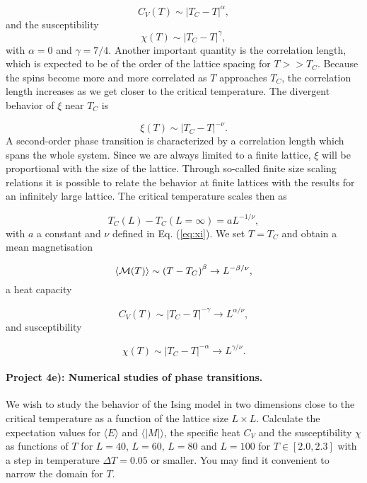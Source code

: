 \documentclass[10pt,showpacs,preprintnumbers,footinbib,amsmath,amssymb,aps,prl,twocolumn,groupedaddress,superscriptaddress,showkeys]{revtex4-1}
\begin{document}
\[
  C_V(T) \sim \left|T_C-T\right|^{\alpha},
\]
and the susceptibility
\begin{equation}
  \chi(T) \sim \left|T_C-T\right|^{\gamma},
\end{equation}
with $\alpha = 0$ and $\gamma = 7/4$.
Another important quantity is the correlation length, which is expected
to be of the order of the lattice spacing for $T>> T_C$. Because the spins
become more and more correlated as $T$ approaches $T_C$, the correlation
length increases as we get closer to the critical temperature. The divergent
behavior of $\xi$ near $T_C$ 
is

\begin{equation}
  \xi(T) \sim \left|T_C-T\right|^{-\nu}.
  \label{eq:xi}
\end{equation}
A second-order phase transition is characterized by a
correlation length which spans the whole system.
Since we are always limited to a finite lattice, $\xi$ will
be proportional with the size of the lattice. 
Through so-called finite size scaling relations
it is possible to relate the behavior at finite lattices with the 
results for an infinitely large lattice.
The critical temperature scales then as

\begin{equation}
 T_C(L)-T_C(L=\infty) = aL^{-1/\nu},
 \label{eq:tc}
\end{equation}
with  $a$ a constant and  $\nu$ defined in Eq. (\ref{eq:xi}).
We set $T=T_C$ and obtain a mean magnetisation

\begin{equation}
  \langle {\cal M}(T) \rangle \sim \left(T-T_C\right)^{\beta}
  \rightarrow L^{-\beta/\nu},
  \label{eq:scale1}
\end{equation}
a heat capacity

\begin{equation}
  C_V(T) \sim \left|T_C-T\right|^{-\gamma} \rightarrow L^{\alpha/\nu},
  \label{eq:scale2}
\end{equation}
and susceptibility

\begin{equation}
  \chi(T) \sim \left|T_C-T\right|^{-\alpha} \rightarrow L^{\gamma/\nu}.
  \label{eq:scale3}
\end{equation}


\paragraph{Project 4e): Numerical studies of phase transitions.}
We wish to study the behavior of the Ising model
in two dimensions close to the critical temperature as a function of
the lattice size $L\times L$. Calculate the expectation values for
$\langle E\rangle$ and $\langle \vert M\vert \rangle$, the specific heat
$C_V$ and the susceptibility $\chi$ as functions of $T$ for $L=40$,
$L=60$, $L=80$ and $L=100$ for $T\in [2.0,2.3]$ with a step in
temperature $\Delta T=0.05$ or smaller.  You may find it convenient to narrow the domain for $T$. 
\end{document}

